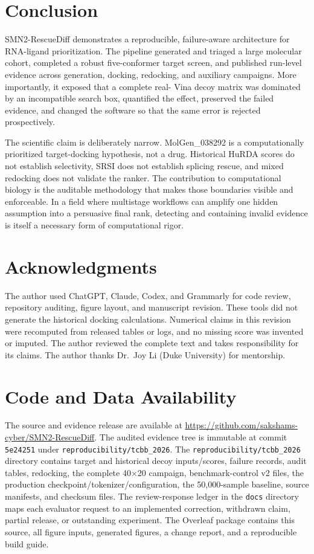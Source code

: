 \documentclass[journal]{IEEEtran}
\begin{document}
\section{Conclusion}

SMN2-RescueDiff demonstrates a reproducible, failure-aware architecture
for RNA-ligand prioritization. The pipeline generated and triaged a large
molecular cohort, completed a robust five-conformer target screen, and
published run-level evidence across generation, docking, redocking, and
auxiliary campaigns. More importantly, it exposed that a complete real-
Vina decoy matrix was dominated by an incompatible search box, quantified
the effect, preserved the failed evidence, and changed the software so
that the same error is rejected prospectively.

The scientific claim is deliberately narrow. MolGen\_038292 is a
computationally prioritized target-docking hypothesis, not a drug.
Historical HuRDA scores do not establish selectivity, SRSI does not
establish splicing rescue, and mixed redocking does not validate the
ranker. The contribution to computational biology is the auditable
methodology that makes those boundaries visible and enforceable. In a
field where multistage workflows can amplify one hidden assumption into
a persuasive final rank, detecting and containing invalid evidence is
itself a necessary form of computational rigor.

\section*{Acknowledgments}

The author used ChatGPT, Claude, Codex, and Grammarly for code review,
repository auditing, figure layout, and manuscript revision. These tools
did not generate the historical docking calculations. Numerical claims
in this revision were recomputed from released tables or logs, and no
missing score was invented or imputed. The author reviewed the complete
text and takes responsibility for its claims. The author thanks
Dr.~Joy Li (Duke University) for mentorship.

\section*{Code and Data Availability}

The source and evidence release are available at
\url{https://github.com/}\url{sakshams-cyber/SMN2-RescueDiff}. The
audited evidence tree is immutable at commit \texttt{5e24251} under
\texttt{reproducibility/tcbb\_2026}. The
\texttt{reproducibility/tcbb\_2026} directory contains target and
historical decoy inputs/scores, failure records, audit tables, redocking,
the complete 40$\times$20 campaign, benchmark-control v2 files, the
production checkpoint/tokenizer/configuration, the 50,000-sample
baseline, source manifests, and checksum files. The
review-response ledger in the \texttt{docs} directory maps each
evaluator request to an implemented correction, withdrawn claim,
partial release, or outstanding experiment. The Overleaf package
contains this source, all figure inputs, generated figures, a change
report, and a reproducible build guide.
\end{document}
